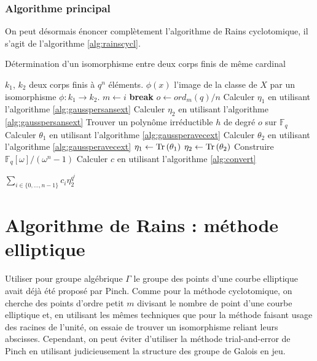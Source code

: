 \documentclass[a4paper]{article} %
\numberwithin{section}{part}
\numberwithin{equation}{section}
\newcommand\zmodninv[1]{(\mathbb{Z}/#1\mathbb{Z})^{\times}}
\newcommand\GF[1]{\mathbb{F}_{#1}}
\newcommand\Tr[1]{\textup{Tr}\left(#1\right)}
\begin{document}
\subsubsection*{Algorithme principal}

On peut désormais énoncer complètement l'algorithme de Rains cyclotomique, il
s'agit de l'algorithme \ref{alg:rainscycl}.

\begin{algorithm}
\caption{Détermination d'un isomorphisme entre deux corps finis de même
cardinal}
\label{alg:rainscycl}
\begin{algorithmic}[1]
\REQUIRE $k_1$, $k_2$ deux corps finis à $q^n$ éléments.
\ENSURE $\phi(x)$ l'image de la classe de $X$ par un isomorphisme $\phi : k_1
\to k_2$. 
\bigskip
{}
\IF{$\big(n\mid\varphi(i)\big)$ \& $\big((n,\varphi(i)/n) = 1\big)$ \&
$\big(\exists\alpha\in\zmodninv{m} : ord_m(\alpha) = n\big)$}
    \STATE $m \leftarrow i$
    \STATE \textbf{break}
\ENDIF
\ENDFOR
\STATE $o \leftarrow ord_m(q)/n$
    \STATE Calculer $\eta_1$ en utilisant l'algorithme \ref{alg:gausspersansext}
    \STATE Calculer $\eta_2$ en utilisant l'algorithme \ref{alg:gausspersansext}
\ELSE
    \STATE Trouver un polynôme irréductible $h$ de degré $o$ sur $\GF{q}$
    \STATE Calculer $\theta_1$ en utilisant l'algorithme 
    \ref{alg:gaussperavecext}
    \STATE Calculer $\theta_2$ en utilisant l'algorithme 
    \ref{alg:gaussperavecext}
    \STATE $\eta_1 \leftarrow \Tr{\theta_1}$
    \STATE $\eta_2 \leftarrow \Tr{\theta_2}$
\ENDIF
\STATE Construire $\GF{q}[\omega]/(\omega^n - 1)$
\STATE Calculer $c$ en utilisant l'algorithme \ref{alg:convert}

\RETURN $\sum_{i\in\lbrace{0,\dots,n-1}\rbrace}{c_i\eta_2^{q^i}}$

\end{algorithmic}
\end{algorithm}

\section{Algorithme de Rains : méthode elliptique}
Utiliser pour groupe algébrique $\Gamma$ le groupe des points d'une courbe
elliptique avait déjà été proposé par Pinch\cite{Pin}. Comme pour la méthode
cyclotomique, on cherche des points d'ordre petit $m$ divisant le nombre de
point d'une courbe elliptique et, en utilisant les mêmes techniques que pour la
méthode faisant usage des racines de l'unité, on essaie de trouver un
isomorphisme reliant leurs abscisses. Cependant, on peut éviter d'utiliser la
méthode trial-and-error de Pinch en utilisant judicieusement la structure des
groupe de Galois en jeu. 
\end{document}
